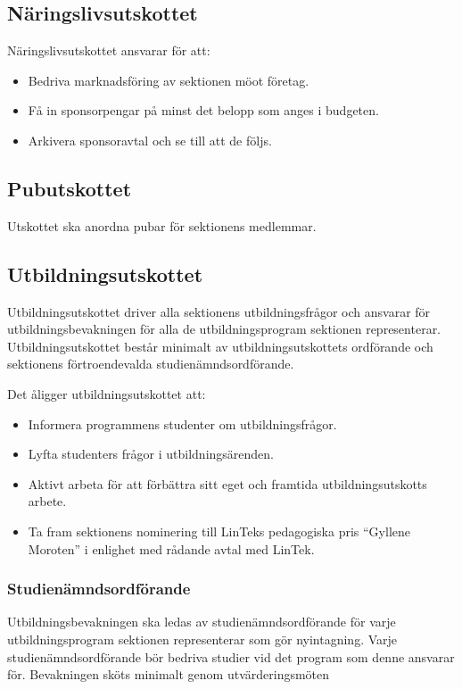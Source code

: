 \documentclass{datateknologsektionen-document}
\begin{document}
\subsection{Näringslivsutskottet}
Näringslivsutskottet ansvarar för att:
\begin{itemize}
  \item Bedriva marknadsföring av sektionen möot företag.
  \item Få in sponsorpengar på minst det belopp som anges i budgeten.
  \item Arkivera sponsoravtal och se till att de följs.
\end{itemize}

\subsection{Pubutskottet}
Utskottet ska anordna pubar för sektionens medlemmar.

\subsection{Utbildningsutskottet}
Utbildningsutskottet driver alla sektionens utbildningsfrågor och ansvarar för
utbildningsbevakningen för alla de utbildningsprogram sektionen representerar.
Utbildningsutskottet består minimalt av utbildningsutskottets ordförande och
sektionens förtroendevalda studienämndsordförande.

Det åligger utbildningsutskottet att:
\begin{itemize}
  \item Informera programmens studenter om utbildningsfrågor.
  \item Lyfta studenters frågor i utbildningsärenden.
  \item Aktivt arbeta för att förbättra sitt eget och framtida utbildningsutskotts arbete.
  \item Ta fram sektionens nominering till LinTeks pedagogiska pris ``Gyllene Moroten'' i enlighet med rådande avtal med LinTek.
\end{itemize}

\subsubsection{Studienämndsordförande}
Utbildningsbevakningen ska ledas av studienämndsordförande för varje utbildningsprogram
sektionen representerar som gör nyintagning. Varje studienämndsordförande bör bedriva
studier vid det program som denne ansvarar för. Bevakningen sköts minimalt genom utvärderingsmöten
\end{document}
